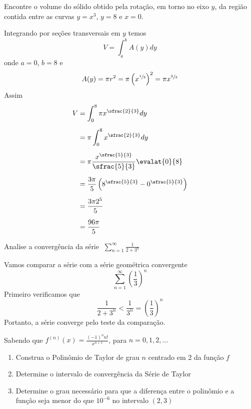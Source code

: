 \documentclass[a4paper,12pt,fleqn]{article}
\begin{document}
\vspace{\baselineskip}
Encontre o volume do sólido obtido pela rotação, em torno no eixo $y$,
da região contida entre as curvas \(y=x^3\), \(y=8\) e \(x=0\).

\begin{answer}
  Integrando por seções transversais em $y$ temos
  \[
    V = \int_a^b A(y) dy
  \]
  onde \(a=0\), \(b=8\) e
  \[
    A(y) = \pi r^2 = \pi \left(x^{\sfrac{1}{3}}\right)^2 = \pi x^{\sfrac{2}{3}}
  \]
  Assim
  \begin{align*}
      V
      & = \int_0^8 \pi x^{\sfrac{2}{3}} dy \\[2mm]
      & = \pi \int_0^8 x^{\sfrac{2}{3}} dy \\[2mm]
      & = \pi \frac{x^{\sfrac{5}{3}}}{\sfrac{5}{3}}\evalat{0}{8} \\[2mm]
      & = \frac{3\pi}{5} \left(8^{\sfrac{5}{3}}-0^{\sfrac{5}{3}}\right) \\[2mm]
      & = \frac{3\pi 2^5}{5} \\[2mm]
      & = \frac{96\pi}{5}
  \end{align*}
\end{answer}

\vspace{\baselineskip}
Analise a convergência da série \(\;\sum_{n=1}^\infty \frac{1}{2+3^n}\)

\begin{answer}
  Vamos comparar a série com a série geométrica convergente
  \[
    \sum_{n=1}^\infty \left(\frac{1}{3}\right)^n
  \]
  Primeiro verificamos que
  \[
    \frac{1}{2+3^n}
    < \frac{1}{3^n}
    = \left(\frac{1}{3}\right)^n
  \]
  Portanto, a série converge pelo teste da comparação.
\end{answer}

\vspace{\baselineskip}
Sabendo que \(f^{(n)}(x) = \frac{(-1)^nn!}{x^{n+1}}\), para \(n=0, 1, 2, \dots\)
\begin{enumerate}[label=\alph*)]
  \item Construa o Polinômio de Taylor de grau $n$ centrado em 2 da função $f$
  \item Determine o intervalo de convergência da Série de Taylor
  \item Determine o grau necessário para que a diferença entre o polinômio e a função
  seja menor do que $10^{-6}$ no intervalo $(2, 3)$
\end{enumerate}
\end{document}
